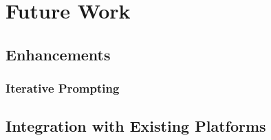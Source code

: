 \chapter{Future Work} \label{chap:chap-6}



\section{Enhancements}

\subsection{Iterative Prompting}

\section{Integration with Existing Platforms}